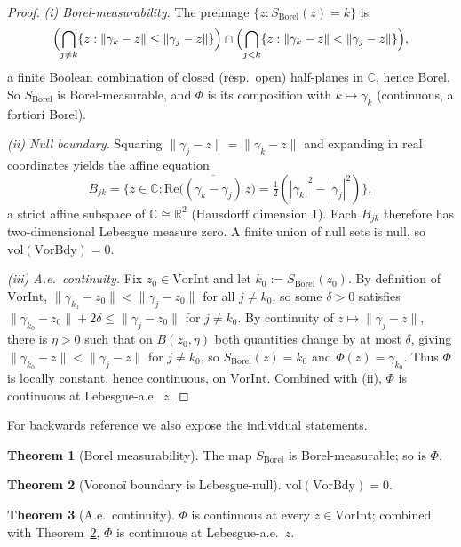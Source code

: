 \documentclass[11pt,a4paper]{article}
\theoremstyle{definition}
\newtheorem{theorem}{Theorem}[section]
\begin{document}
\begin{proof}
\emph{(i) Borel-measurability.} The preimage $\{z : S_{\mathrm{Borel}}(z) = k\}$ is
\[
  \Bigl(\bigcap_{j \neq k} \{z : \|\gamma_k - z\| \leq \|\gamma_j - z\|\}\Bigr)
  \cap
  \Bigl(\bigcap_{j < k} \{z : \|\gamma_k - z\| < \|\gamma_j - z\|\}\Bigr),
\]
a finite Boolean combination of closed (resp.\ open) half-planes in $\mathbb{C}$, hence Borel. So $S_{\mathrm{Borel}}$ is Borel-measurable, and $\Phi$ is its composition with $k \mapsto \gamma_k$ (continuous, a fortiori Borel).

\emph{(ii) Null boundary.} Squaring $\|\gamma_j - z\| = \|\gamma_k - z\|$ and expanding in real coordinates yields the affine equation
\[
  B_{jk} = \bigl\{z \in \mathbb{C} : \mathrm{Re}\bigl(\overline{(\gamma_k - \gamma_j)}\,z\bigr) = \tfrac12(|\gamma_k|^2 - |\gamma_j|^2)\bigr\},
\]
a strict affine subspace of $\mathbb{C} \cong \mathbb{R}^2$ (Hausdorff dimension $1$). Each $B_{jk}$ therefore has two-dimensional Lebesgue measure zero. A finite union of null sets is null, so $\mathrm{vol}(\mathrm{VorBdy}) = 0$.

\emph{(iii) A.e.\ continuity.} Fix $z_0 \in \mathrm{VorInt}$ and let $k_0 := S_{\mathrm{Borel}}(z_0)$. By definition of $\mathrm{VorInt}$, $\|\gamma_{k_0} - z_0\| < \|\gamma_j - z_0\|$ for all $j \neq k_0$, so some $\delta > 0$ satisfies
$\|\gamma_{k_0} - z_0\| + 2\delta \leq \|\gamma_j - z_0\|$ for $j \neq k_0$. By continuity of $z \mapsto \|\gamma_j - z\|$, there is $\eta > 0$ such that on $B(z_0, \eta)$ both quantities change by at most $\delta$, giving $\|\gamma_{k_0} - z\| < \|\gamma_j - z\|$ for $j \neq k_0$, so $S_{\mathrm{Borel}}(z) = k_0$ and $\Phi(z) = \gamma_{k_0}$. Thus $\Phi$ is locally constant, hence continuous, on $\mathrm{VorInt}$. Combined with (ii), $\Phi$ is continuous at Lebesgue-a.e.\ $z$.
\end{proof}

For backwards reference we also expose the individual statements.

\begin{theorem}[Borel measurability]\label{thm:borel}
The map $S_{\mathrm{Borel}}$ is Borel-measurable; so is $\Phi$.
\end{theorem}

\begin{theorem}[Voronoï boundary is Lebesgue-null]\label{thm:julia-null}
$\mathrm{vol}(\mathrm{VorBdy}) = 0$.
\end{theorem}

\begin{theorem}[A.e.\ continuity]\label{thm:ae-continuous}
$\Phi$ is continuous at every $z \in \mathrm{VorInt}$; combined with Theorem~\ref{thm:julia-null}, $\Phi$ is continuous at Lebesgue-a.e.\ $z$.
\end{theorem}
\end{document}
